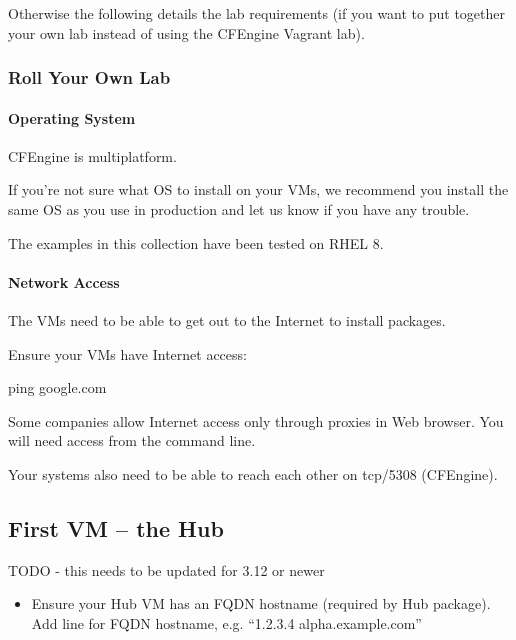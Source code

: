 Otherwise the following details the lab requirements (if you want to put
together your own lab instead of using the CFEngine Vagrant lab).





\subsubsection{Roll Your Own Lab}

\paragraph{Operating System}

CFEngine is multiplatform.

If you're not sure what OS to install on your VMs, we recommend you
install the same OS as you use in production and let us know if you have
any trouble.

The examples in this collection have been tested on RHEL 8.





\paragraph{Network Access}

The VMs need to be able to get out to the Internet to install
packages.

Ensure your VMs have Internet access:

\begin{code}
ping google.com
\end{code}

Some companies allow Internet access only through proxies in Web
browser. You will need access from the command line.

Your systems also need to be able to reach each other on tcp/5308
(CFEngine).





\subsection{First VM -- the Hub}

TODO - this needs to be updated for 3.12 or newer

\begin{itemize}
\item{} Ensure your Hub VM has an FQDN hostname (required by Hub package).
Add line for FQDN hostname, e.g. ``1.2.3.4 alpha.example.com''
\end{itemize}

